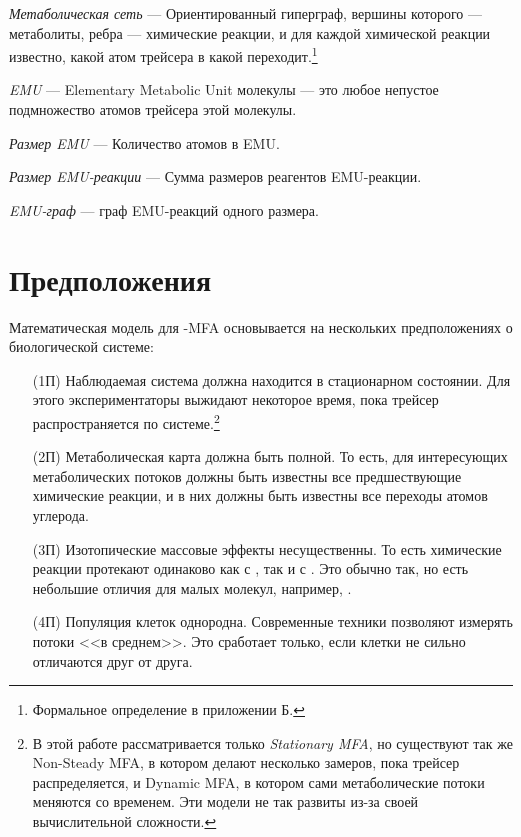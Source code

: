 \documentclass[14pt, a4paper]{extreport}
\begin{document}
\hangindent=1cm \noindent
\emph{Метаболическая сеть} --- Ориентированный гиперграф, вершины которого --- метаболиты, ребра --- химические реакции, и для каждой химической реакции известно, какой атом трейсера в какой переходит.\footnote{Формальное определение в приложении Б.}

\hangindent=1cm \noindent
\emph{EMU} --- Elementary Metabolic Unit молекулы --- это любое непустое подмножество атомов трейсера этой молекулы.

\hangindent=1cm \noindent
\emph{Размер EMU} --- Количество атомов в EMU.

\hangindent=1cm \noindent
\emph{Размер EMU-реакции} --- Сумма размеров реагентов EMU-реакции.

\hangindent=1cm \noindent
\emph{EMU-граф} --- граф EMU-реакций одного размера.



\clearpage

\section{Предположения}
Математическая модель для -MFA основывается на нескольких предположениях о биологической системе\cite{Wiechert_1997_1}:
\begin{enumerate}
	\item[(1П)] Наблюдаемая система должна находится в стационарном состоянии. Для этого экспериментаторы выжидают некоторое время, пока трейсер распространяется по системе.\footnote{В этой работе рассматривается только \emph{Stationary MFA}, но существуют так же Non-Steady MFA\cite{NMFA}, в котором делают несколько замеров, пока трейсер распределяется, и Dynamic MFA\cite{DMFA}, в котором сами метаболические потоки меняются со временем. Эти модели не так развиты из-за своей вычислительной сложности.}
	
	\item[(2П)] Метаболическая карта должна быть полной. То есть, для интересующих метаболических потоков должны быть известны все предшествующие химические реакции, и в них должны быть известны все переходы атомов углерода.
	
	\item[(3П)] Изотопические массовые эффекты несущественны. То есть химические реакции протекают одинаково как с , так и с . Это обычно так, но есть небольшие отличия для малых молекул, например, .
	
	\item[(4П)] Популяция клеток однородна. Современные техники позволяют измерять потоки <<в среднем>>. Это сработает только, если клетки не сильно отличаются друг от друга.
\end{enumerate}
\end{document}
